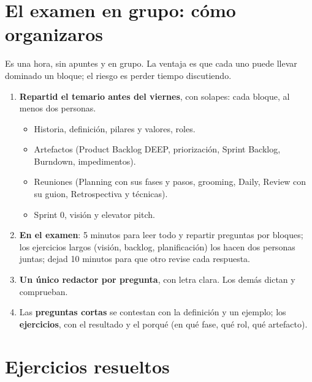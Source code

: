 \documentclass[11pt,a4paper,oneside,openany]{report}
\begin{document}
\section{El examen en grupo: cómo organizaros}
Es una hora, sin apuntes y en grupo. La ventaja es que cada uno puede llevar dominado un bloque; el riesgo es perder
tiempo discutiendo.
\begin{enumerate}[leftmargin=*]
  \item \textbf{Repartid el temario antes del viernes}, con solapes: cada bloque, al menos dos personas.
        \begin{itemize}[itemsep=1pt]
          \item Historia, definición, pilares y valores, roles.
          \item Artefactos (Product Backlog DEEP, priorización, Sprint Backlog, Burndown, impedimentos).
          \item Reuniones (Planning con sus fases y pasos, grooming, Daily, Review con su guion, Retrospectiva y técnicas).
          \item Sprint 0, visión y elevator pitch.
        \end{itemize}
  \item \textbf{En el examen}: 5 minutos para leer todo y repartir preguntas por bloques; los ejercicios largos
        (visión, backlog, planificación) los hacen dos personas juntas; dejad 10 minutos para que otro revise cada
        respuesta.
  \item \textbf{Un único redactor por pregunta}, con letra clara. Los demás dictan y comprueban.
  \item Las \textbf{preguntas cortas} se contestan con la definición y un ejemplo; los \textbf{ejercicios}, con el
        resultado y el porqué (en qué fase, qué rol, qué artefacto).
\end{enumerate}

\section{Ejercicios resueltos}
\end{document}

